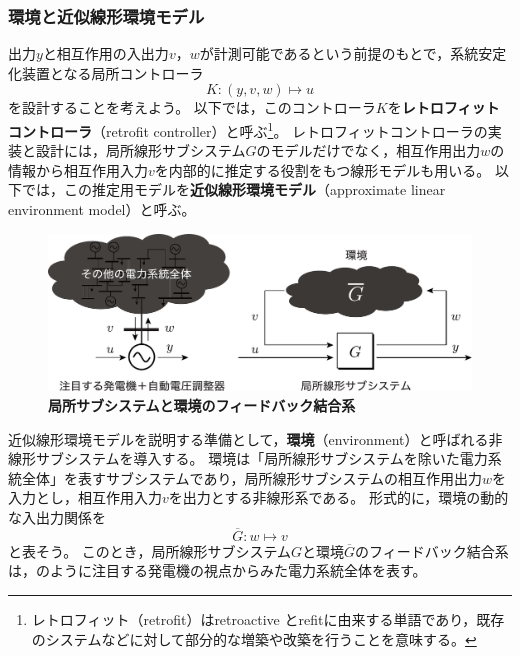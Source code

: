 \documentclass[tombow,dvipdfmx]{corona-a5-1.1}
\begin{document}
\subsubsection{環境と近似線形環境モデル}

出力$y$と相互作用の入出力$v$，$w$が計測可能であるという前提のもとで，系統安定化装置となる局所コントローラ
\[
K : (y,v,w)\mapsto u
\]
を設計することを考えよう。
以下では，このコントローラ$K$を\textbf{レトロフィットコントローラ}（retrofit controller）と呼ぶ\footnote{
レトロフィット（retrofit）はretroactive とrefitに由来する単語であり，既存のシステムなどに対して部分的な増築や改築を行うことを意味する。
}。
レトロフィットコントローラの実装と設計には，局所線形サブシステム$G$のモデルだけでなく，相互作用出力$w$の情報から相互作用入力$v$を内部的に推定する役割をもつ線形モデルも用いる。
以下では，この推定用モデルを\textbf{近似線形環境モデル}（approximate linear environment model）と呼ぶ。

\begin{figure}[t]
\centering
\includegraphics[width = .99\linewidth]{figs/retconsys2}
\medskip
\caption{\textbf{局所サブシステムと環境のフィードバック結合系}}
\label{fig:retconsys}
\medskip
\end{figure}


近似線形環境モデルを説明する準備として，\textbf{環境}（environment）と呼ばれる非線形サブシステムを導入する。
環境は「局所線形サブシステムを除いた電力系統全体」を表すサブシステムであり，局所線形サブシステムの相互作用出力$w$を入力とし，相互作用入力$v$を出力とする非線形系である。
形式的に，環境の動的な入出力関係を
\[
\overline{G} : w\mapsto v
\]
と表そう。
このとき，局所線形サブシステム$G$と環境$\overline{G}$のフィードバック結合系は，のように注目する発電機の視点からみた電力系統全体を表す。
\end{document}
